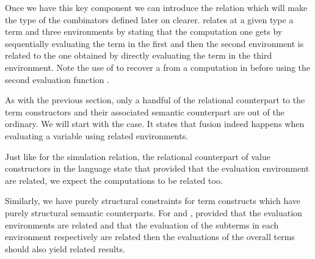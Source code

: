 
Once we have this key component we can introduce the relation  which
will make the type of the combinators defined later on clearer.  relates
at a given type a term and three environments by stating that the computation
one gets by sequentially evaluating the term in the first and then the second
environment is related to the one obtained by directly evaluating the term in
the third environment. Note the use of  to recover a 
from a computation in  before using the second evaluation function
{ }.


As with the previous section, only a handful of the relational counterpart
to the term constructors and their associated semantic counterpart are out
of the ordinary. We will start with the  case. It states that
fusion indeed happens when evaluating a variable using related environments.

\begin{AgdaSuppressSpace}
\end{AgdaSuppressSpace}

Just like for the simulation relation, the relational counterpart of value
constructors in the language state that provided that the evaluation environment
are related, we expect the computations to be related too.

\noindent\begin{minipage}{0.65\textwidth}
\end{minipage}\begin{minipage}{0.35\textwidth}
\end{minipage}

Similarly, we have purely structural constraints for term constructs which
have purely structural semantic counterparts. For  and ,
provided that the evaluation environments are related and that the evaluation
of the subterms in each environment respectively are related then the evaluations
of the overall terms should also yield related results.

